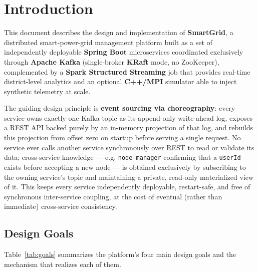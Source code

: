 \section{Introduction}

This document describes the design and implementation of \textbf{SmartGrid}, a distributed
smart-power-grid management platform built as a set of independently deployable \textbf{Spring
Boot} microservices coordinated exclusively through \textbf{Apache Kafka} (single-broker
\textbf{KRaft} mode, no ZooKeeper), complemented by a \textbf{Spark Structured Streaming} job
that provides real-time district-level analytics and an optional \textbf{C++/MPI} simulator able
to inject synthetic telemetry at scale.

The guiding design principle is \textbf{event sourcing via choreography}: every service owns
exactly one Kafka topic as its append-only write-ahead log, exposes a REST API backed purely by
an in-memory projection of that log, and rebuilds this projection from offset zero on startup
before serving a single request. No service ever calls another service synchronously over REST to
read or validate its data; cross-service knowledge --- e.g. \texttt{node-manager} confirming that
a \texttt{userId} exists before accepting a new node --- is obtained exclusively by subscribing to
the owning service's topic and maintaining a private, read-only materialized view of it. This
keeps every service independently deployable, restart-safe, and free of synchronous
inter-service coupling, at the cost of eventual (rather than immediate) cross-service
consistency.

\subsection*{Design Goals}
Table~\ref{tab:goals} summarizes the platform's four main design goals and the mechanism that
realizes each of them.

